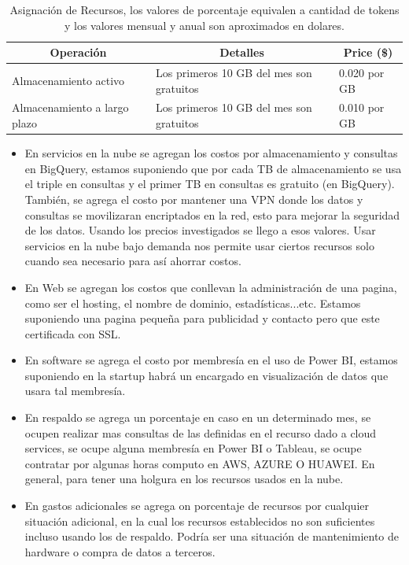 \documentclass[12pt,a4paper,openright]{article}
\begin{document}
\begin{table}[ht]
\begin{adjustbox}{width=\textwidth}
\begin{tabular}{|l|l|l|}
\hline
\multicolumn{1}{|c|}{\textbf{Operación}} & \multicolumn{1}{c|}{\textbf{Detalles}}   & \multicolumn{1}{c|}{\textbf{Price (\$)}} \\ \hline \hline
Almacenamiento activo                    & Los primeros 10 GB del mes son gratuitos & 0.020 por GB                             \\ \hline
Almacenamiento a largo plazo             & Los primeros 10 GB del mes son gratuitos & 0.010 por GB                             \\ \hline
\end{tabular}
\end{adjustbox}
\caption{Asignaci\'on de Recursos, los valores de porcentaje equivalen a cantidad de tokens y los valores mensual y anual son aproximados en dolares.}
\end{table}

\begin{itemize}
    \item En servicios en la nube se agregan los costos por almacenamiento y consultas en BigQuery, estamos suponiendo que por cada TB de almacenamiento se usa el triple en consultas y el primer TB en consultas es gratuito (en BigQuery). También, se agrega el costo por mantener una VPN donde los datos y consultas se movilizaran encriptados en la red, esto para mejorar la seguridad de los datos. Usando los precios investigados se llego a esos valores. Usar servicios en la nube bajo demanda nos permite usar ciertos recursos solo cuando sea necesario para así ahorrar costos.
    \item En Web se agregan los costos que conllevan la administración de una pagina, como ser el hosting, el nombre de dominio, estadísticas...etc. Estamos suponiendo una pagina pequeña para publicidad y contacto pero que este certificada con SSL.
    \item En software se agrega el costo por membresía en el uso de Power BI, estamos suponiendo en la startup habrá un encargado en visualización de datos que usara tal membresía.
    \item En respaldo se agrega un porcentaje en caso en un determinado mes, se ocupen realizar mas consultas de las definidas en el recurso dado a cloud services, se ocupe alguna membresía en Power BI o Tableau, se ocupe contratar por algunas horas computo en AWS, AZURE O HUAWEI. En general, para tener una holgura en los recursos usados en la nube.
    \item En gastos adicionales se agrega on porcentaje de recursos por cualquier situación adicional, en la cual los recursos establecidos no son suficientes incluso usando los de respaldo. Podría ser una situación de mantenimiento de hardware o compra de datos a terceros.
\end{itemize}
\end{document}
